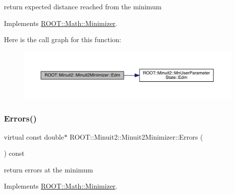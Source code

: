 return expected distance reached from the minimum 



Implements \mbox{\hyperlink{classROOT_1_1Math_1_1Minimizer_a990c6935849a3fb31aedab1df6c26f28}{R\+O\+O\+T\+::\+Math\+::\+Minimizer}}.

Here is the call graph for this function\+:
\nopagebreak
\begin{figure}[H]
\begin{center}
\leavevmode
\includegraphics[width=350pt]{d0/d9c/classROOT_1_1Minuit2_1_1Minuit2Minimizer_ab9c1bfaaaf4c12acd1fd96ece3509269_cgraph}
\end{center}
\end{figure}
\mbox{\label{classROOT_1_1Minuit2_1_1Minuit2Minimizer_a69c6dd9654ce41856814b358570cb9d7}} 
\subsubsection{\texorpdfstring{Errors()}{Errors()}\hspace{0.1cm}{\footnotesize\ttfamily [1/3]}}
{\footnotesize\ttfamily virtual const double$\ast$ R\+O\+O\+T\+::\+Minuit2\+::\+Minuit2\+Minimizer\+::\+Errors (\begin{DoxyParamCaption}{ }\end{DoxyParamCaption}) const\hspace{0.3cm}{\ttfamily [virtual]}}



return errors at the minimum 



Implements \mbox{\hyperlink{classROOT_1_1Math_1_1Minimizer_a42f71e22f16cf4c59b621cf7e1e75f3d}{R\+O\+O\+T\+::\+Math\+::\+Minimizer}}.

\mbox{\label{classROOT_1_1Minuit2_1_1Minuit2Minimizer_a69c6dd9654ce41856814b358570cb9d7}} 
